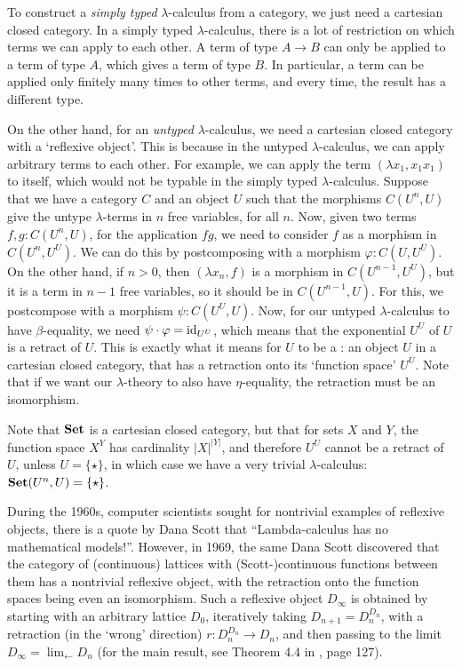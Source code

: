 \begin{remark}
  To construct a \textit{simply typed} $ \lambda $-calculus from a category, we just need a cartesian closed category. In a simply typed $ \lambda $-calculus, there is a lot of restriction on which terms we can apply to each other. A term of type $ A \to B $ can only be applied to a term of type $ A $, which gives a term of type $ B $. In particular, a term can be applied only finitely many times to other terms, and every time, the result has a different type.

  On the other hand, for an \textit{untyped} $ \lambda $-calculus, we need a cartesian closed category with a `reflexive object'. This is because in the untyped $ \lambda $-calculus, we can apply arbitrary terms to each other. For example, we can apply the term $ (\lambda x_1, x_1 x_1) $ to itself, which would not be typable in the simply typed $ \lambda $-calculus. Suppose that we have a category $ C $ and an object $ U $ such that the morphisms $ C(U^n, U) $ give the untype $ \lambda $-terms in $ n $ free variables, for all $ n $. Now, given two terms $ f, g : C(U^n, U) $, for the application $ f g $, we need to consider $ f $ as a morphism in $ C(U^n, U^U) $. We can do this by postcomposing with a morphism $ \varphi: C(U, U^U) $. On the other hand, if $ n > 0 $, then $ (\lambda x_n, f) $ is a morphism in $ C(U^{n - 1}, U^U) $, but it is a term in $ n - 1 $ free variables, so it should be in $ C(U^{n - 1}, U) $. For this, we postcompose with a morphism $ \psi: C(U^U, U) $. Now, for our untyped $ \lambda $-calculus to have $ \beta $-equality, we need $ \psi \cdot \varphi = \text{id}_{U^U} $, which means that the exponential $ U^U $ of $ U $ is a retract of $ U $. This is exactly what it means for $ U $ to be a : an object $ U $ in a cartesian closed category, that has a retraction onto its `function space' $ U^U $. Note that if we want our $ \lambda $-theory to also have $ \eta $-equality, the retraction must be an isomorphism.

  Note that $ \mathbf{Set} $ is a cartesian closed category, but that for sets $ X $ and $ Y $, the function space $ X^Y $ has cardinality $ \vert X \vert^{\vert Y \vert} $, and therefore $ U^U $ cannot be a retract of $ U $, unless $ U = \{ \star \} $, in which case we have a very trivial $ \lambda $-calculus: $ \mathbf{Set}(U^n, U) = \{ \star \} $.

  During the 1960s, computer scientists sought for nontrivial examples of reflexive objects, there is a quote by Dana Scott that ``Lambda-calculus has no mathematical models!''\cite{strachey}. However, in 1969, the same Dana Scott discovered that the category of (continuous) lattices with (Scott-)continuous functions between them has a nontrivial reflexive object, with the retraction onto the function spaces being even an isomorphism. Such a reflexive object $ D_\infty $ is obtained by starting with an arbitrary lattice $ D_0 $, iteratively taking $ D_{n + 1} = D_n^{D_n} $, with a retraction (in the `wrong' direction) $ r: D_n^{D_n} \to D_n $, and then passing to the limit $ D_\infty = \lim_{\leftarrow} D_n $ (for the main result, see Theorem 4.4 in \cite{scott-continuous}, page 127).
\end{remark}

